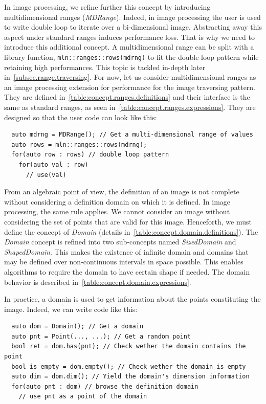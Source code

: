 In image processing, we refine further this concept by introducing multidimensional ranges (\emph{MDRange}). Indeed, in
image processing the user is used to write double loop to iterate over a bi-dimensional image. Abstracting away this
aspect under standard ranges induces performance loss. That is why we need to introduce this additional concept. A
multidimensional range can be split with a library function, \texttt{mln::ranges::rows(mdrng)} to fit the double-loop
pattern while retaining high performances. This topic is tackled in-depth later in~\cref{subsec.range.traversing}. For
now, let us consider multidimensional ranges as an image processing extension for performance for the image traversing
pattern. They are defined in~\cref{table:concept.ranges.definitions} and their interface is the same as standard ranges,
as seen in~\cref{table:concept.ranges.expressions}. They are designed so that the user code can look like this:
\begin{verbatim}
  auto mdrng = MDRange(); // Get a multi-dimensional range of values
  auto rows = mln::ranges::rows(mdrng);
  for(auto row : rows) // double loop pattern
    for(auto val : row)
      // use(val)
\end{verbatim}

From an algebraic point of view, the definition of an image is not complete without considering a definition domain on
which it is defined. In image processing, the same rule applies. We cannot consider an image without considering the set
of points that are valid for this image. Henceforth, we must define the concept of \emph{Domain} (details
in~\cref{table:concept.domain.definitions}). The \emph{Domain} concept is refined into two sub-concepts named
\emph{SizedDomain} and \emph{ShapedDomain}. This makes the existence of infinite domain and domains that may be defined
over non-continuous intervals in space possible. This enables algorithms to require the domain to have certain shape if
needed. The domain behavior is described in~\cref{table:concept.domain.expressions}.

In practice, a domain is used to get information about the points constituting the image. Indeed, we can write code
like this:
\begin{verbatim}
  auto dom = Domain(); // Get a domain
  auto pnt = Point(..., ...); // Get a random point
  bool ret = dom.has(pnt); // Check wether the domain contains the point
  bool is_empty = dom.empty(); // Check wether the domain is empty
  auto dim = dom.dim(); // Yield the domain's dimension information
  for(auto pnt : dom) // browse the definition domain
    // use pnt as a point of the domain
\end{verbatim}


